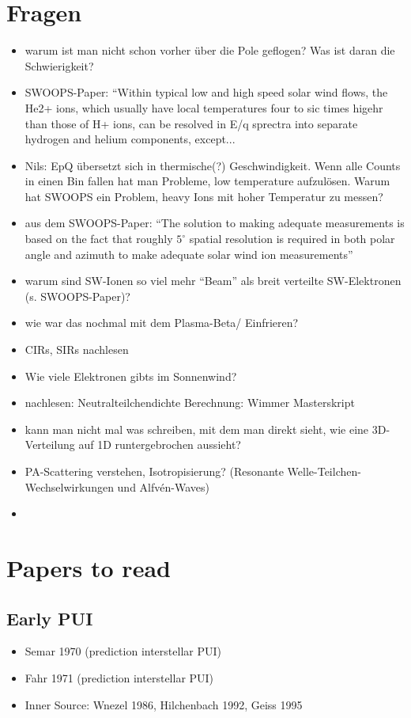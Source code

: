 \documentclass[]{article}
\begin{document}
\section{Fragen}
\begin{itemize}
	\item warum ist man nicht schon vorher über die Pole geflogen? Was ist daran die Schwierigkeit?
	\item SWOOPS-Paper: “Within typical low and high speed solar wind flows, the He2+ ions, which usually have local temperatures four to sic times higehr than those of H+ ions, can be resolved in E/q sprectra into separate hydrogen and helium components, except...
	\item Nils: EpQ übersetzt sich in thermische(?) Geschwindigkeit. Wenn alle Counts in einen Bin fallen hat man Probleme, low temperature aufzulösen. Warum hat SWOOPS ein Problem,  heavy Ions mit hoher Temperatur zu messen? 
	\item aus dem SWOOPS-Paper: “The solution to making adequate measurements is based on the fact that roughly $5^\circ$ spatial resolution is required in both polar angle and azimuth to make adequate solar wind ion measurements”
	\item warum sind SW-Ionen so viel mehr “Beam” als breit verteilte SW-Elektronen (s. SWOOPS-Paper)?
	\item wie war das nochmal mit dem Plasma-Beta/ Einfrieren?
	\item CIRs, SIRs nachlesen
	\item Wie viele Elektronen gibts im Sonnenwind?
	\item nachlesen: Neutralteilchendichte Berechnung: Wimmer Masterskript
	\item kann man nicht mal was schreiben, mit dem man direkt sieht, wie eine 3D-Verteilung auf 1D runtergebrochen aussieht?
	\item PA-Scattering verstehen, Isotropisierung? (Resonante Welle-Teilchen-Wechselwirkungen und Alfvén-Waves)
	\item 
\end{itemize}
%
%
%
\section{Papers to read}
%
\subsection{Early PUI}
\begin{itemize}
	\item Semar 1970 (prediction interstellar PUI)
	\item Fahr 1971 (prediction interstellar PUI)
	\item Inner Source: Wnezel 1986, Hilchenbach 1992, Geiss 1995
\end{itemize}
%
\end{document}
